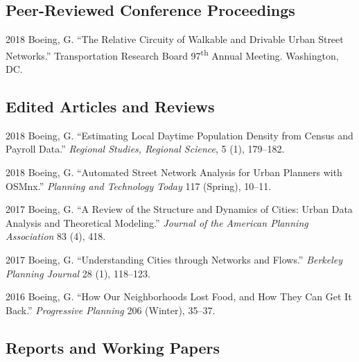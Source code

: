 \documentclass[12pt,letterpaper]{report}
\begin{document}
	
	
	\subsection*{Peer-Reviewed Conference Proceedings}
	
	\begin{tablist}
		
		\item[2018] \tab Boeing, G. \enquote{The Relative Circuity of Walkable and Drivable Urban Street Networks.} Transportation Research Board 97\textsuperscript{th} Annual Meeting. Washington, DC.
		
	\end{tablist}
	
	
	
	\subsection*{Edited Articles and Reviews}
	
	\begin{tablist}
		
		\item[2018] \tab Boeing, G. \enquote{Estimating Local Daytime Population Density from Census and Payroll Data.} \textit{Regional Studies, Regional Science}, 5 (1), 179--182.
		
		\item[2018] \tab Boeing, G. \enquote{Automated Street Network Analysis for Urban Planners with OSMnx.} \textit{Planning and Technology Today} 117 (Spring), 10--11.
		
		\item[2017] \tab Boeing, G. \enquote{A Review of the Structure and Dynamics of Cities: Urban Data Analysis and Theoretical Modeling.} \textit{Journal of the American Planning Association} 83 (4), 418.
		
		\item[2017] \tab Boeing, G. \enquote{Understanding Cities through Networks and Flows.} \textit{Berkeley Planning Journal} 28 (1), 118--123.
		
		\item[2016] \tab Boeing, G. \enquote{How Our Neighborhoods Lost Food, and How They Can Get It Back.} \textit{Progressive Planning} 206 (Winter), 35--37.
		
	\end{tablist}
	
	
	
	\subsection*{Reports and Working Papers}
	
\end{document}
